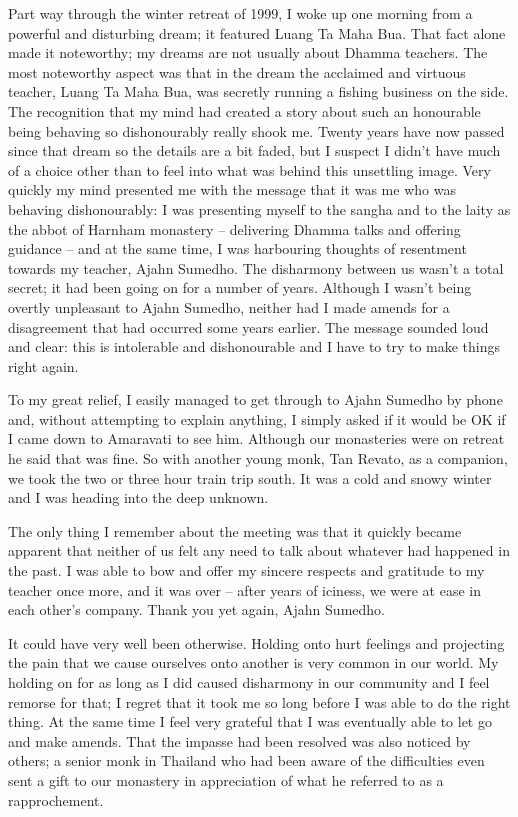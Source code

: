 Part way through the winter retreat of 1999, I woke up one morning from
a powerful and disturbing dream; it featured Luang Ta Maha Bua. That
fact alone made it noteworthy; my dreams are not usually about Dhamma
teachers. The most noteworthy aspect was that in the dream the acclaimed
and virtuous teacher, Luang Ta Maha Bua, was secretly running a fishing
business on the side. The recognition that my mind had created a story
about such an honourable being behaving so dishonourably really shook
me. Twenty years have now passed since that dream so the details are a
bit faded, but I suspect I didn't have much of a choice other than to
feel into what was behind this unsettling image. Very quickly my mind
presented me with the message that it was me who was behaving
dishonourably: I was presenting myself to the sangha and to the laity as
the abbot of Harnham monastery -- delivering Dhamma talks and offering
guidance -- and at the same time, I was harbouring thoughts of
resentment towards my teacher, Ajahn Sumedho. The disharmony between us
wasn't a total secret; it had been going on for a number of years.
Although I wasn't being overtly unpleasant to Ajahn Sumedho, neither had
I made amends for a disagreement that had occurred some years earlier.
The message sounded loud and clear: this is intolerable and
dishonourable and I have to try to make things right again.

To my great relief, I easily managed to get through to Ajahn Sumedho by
phone and, without attempting to explain anything, I simply asked if it
would be OK if I came down to Amaravati to see him. Although our
monasteries were on retreat he said that was fine. So with another young
monk, Tan Revato, as a companion, we took the two or three hour train
trip south. It was a cold and snowy winter and I was heading into the
deep unknown.

The only thing I remember about the meeting was that it quickly became
apparent that neither of us felt any need to talk about whatever had
happened in the past. I was able to bow and offer my sincere respects
and gratitude to my teacher once more, and it was over -- after years of
iciness, we were at ease in each other's company. Thank you yet again,
Ajahn Sumedho.

It could have very well been otherwise. Holding onto hurt feelings and
projecting the pain that we cause ourselves onto another is very common
in our world. My holding on for as long as I did caused disharmony in
our community and I feel remorse for that; I regret that it took me so
long before I was able to do the right thing. At the same time I feel
very grateful that I was eventually able to let go and make amends. That
the impasse had been resolved was also noticed by others; a senior monk
in Thailand who had been aware of the difficulties even sent a gift to
our monastery in appreciation of what he referred to as a rapprochement.

